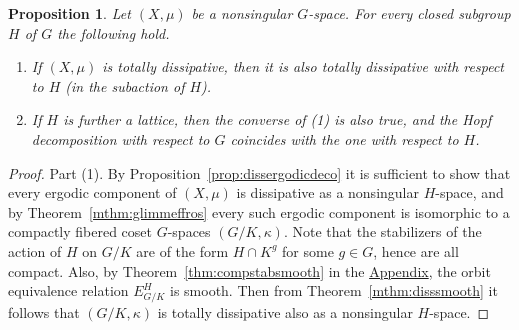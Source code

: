 \documentclass{amsart}
\numberwithin{equation}{subsection}
\newtheorem{prop}[thm]{Proposition}
\begin{document}
\begin{prop}
\label{prop:subgroup}
Let \(\left(X,\mu\right)\) be a nonsingular \(G\)-space. For every closed subgroup \(H\) of \(G\) the following hold.
\begin{enumerate}
    \item If \(\left(X,\mu\right)\) is totally dissipative, then it is also totally dissipative with respect to \(H\) (in the subaction of \(H\)).
    \item If \(H\) is further a lattice, then the converse of (1) is also true, and the Hopf decomposition with respect to \(G\) coincides with the one with respect to \(H\).
\end{enumerate}
\end{prop}

\begin{proof}
Part (1). By Proposition~\ref{prop:dissergodicdeco} it is sufficient to show that every ergodic component of \(\left(X,\mu\right)\) is dissipative as a nonsingular \(H\)-space, and by Theorem~\ref{mthm:glimmeffros} every such ergodic component is isomorphic to a compactly fibered coset \(G\)-spaces \(\left(G/K,\kappa\right)\). Note that the stabilizers of the action of \(H\) on \(G/K\) are of the form \(H\cap K^{g}\) for some \(g\in G\), hence are all compact. Also, by Theorem~\ref{thm:compstabsmooth} in the \hyperref[Appendix: Measures on Homogeneous Spaces]{Appendix}, the orbit equivalence relation \(E_{G/K}^{H}\) is smooth. Then from Theorem~\ref{mthm:disssmooth} it follows that \(\left(G/K,\kappa\right)\) is totally dissipative also as a nonsingular \(H\)-space.


\end{proof}
\end{document}
